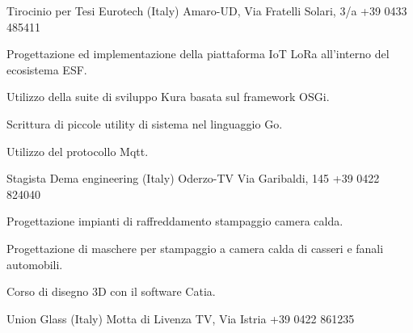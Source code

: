 \documentclass[italian,a4paper]{europasscv}
\begin{document}
\begin{europasscv}

		 {
			Tirocinio per Tesi
		}
		\ecvitem{} {
			Eurotech (Italy)  Amaro-UD,
			Via Fratelli Solari, 3/a \newline +39 0433 485411
			\newline {}
		}
		\ecvitem{} {
			\begin{ecvitemize}
					\item Progettazione ed implementazione della piattaforma
						IoT LoRa all'interno del ecosistema ESF.
					\item Utilizzo della suite di sviluppo Kura basata sul
						framework OSGi.
					\item Scrittura di piccole utility di sistema nel
						linguaggio Go.
					\item Utilizzo del protocollo Mqtt.
			\end{ecvitemize}
		}

		 {
			Stagista
		}
		\ecvitem{} {
			Dema engineering (Italy) Oderzo-TV Via Garibaldi, 145
			\newline +39 0422 824040
			\newline {}
		}
		\ecvitem{} {
			\begin{ecvitemize}
				\item Progettazione impianti di raffreddamento stampaggio
					camera calda.
				\item Progettazione di maschere per stampaggio a camera calda di
					casseri e fanali automobili.
				\item Corso di disegno 3D con il software Catia.
			\end{ecvitemize}
		}

		\ecvitem{} {
			Union Glass (Italy) Motta di Livenza TV, Via Istria
			\newline +39 0422 861235
			\newline {}
		}


\end{europasscv}
\end{document}
